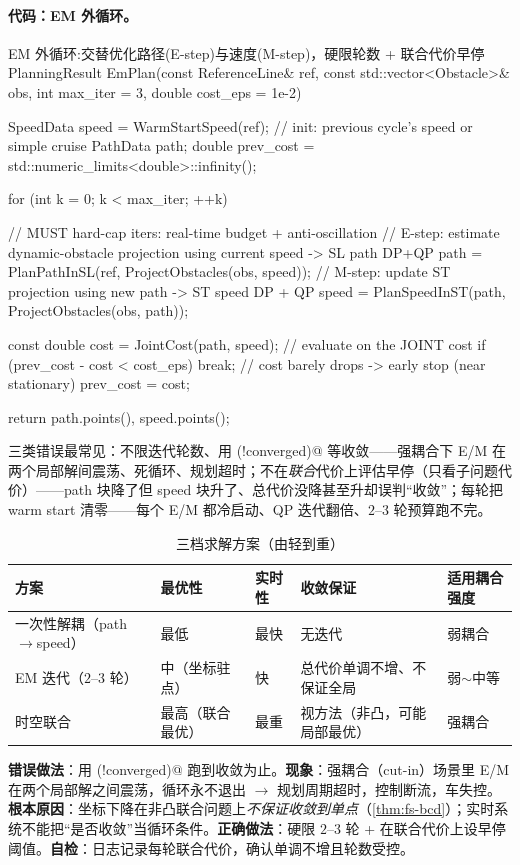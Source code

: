 \paragraph{代码：EM 外循环。}
\begin{codebox}[C++]{EM 外循环:交替优化路径(E-step)与速度(M-step)，硬限轮数 + 联合代价早停}
PlanningResult EmPlan(const ReferenceLine& ref, const std::vector<Obstacle>& obs,
                      int max_iter = 3, double cost_eps = 1e-2) {
  SpeedData speed = WarmStartSpeed(ref);   // init: previous cycle's speed or simple cruise
  PathData  path;
  double prev_cost = std::numeric_limits<double>::infinity();

  for (int k = 0; k < max_iter; ++k) {     // MUST hard-cap iters: real-time budget + anti-oscillation
    // E-step: estimate dynamic-obstacle projection using current speed -> SL path DP+QP
    path  = PlanPathInSL(ref, ProjectObstacles(obs, speed));
    // M-step: update ST projection using new path -> ST speed DP + QP
    speed = PlanSpeedInST(path, ProjectObstacles(obs, path));

    const double cost = JointCost(path, speed);   // evaluate on the JOINT cost
    if (prev_cost - cost < cost_eps) break;       // cost barely drops -> early stop (near stationary)
    prev_cost = cost;
  }
  return {path.points(), speed.points()};
}
\end{codebox}
三类错误最常见：不限迭代轮数、用 \verb@while (!converged)@ 等收敛——强耦合下 E/M 在两个局部解间震荡、死循环、规划超时；不在\emph{联合}代价上评估早停（只看子问题代价）——path 块降了但 speed 块升了、总代价没降甚至升却误判“收敛”；每轮把 warm start 清零——每个 E/M 都冷启动、QP 迭代翻倍、$2$--$3$ 轮预算跑不完。

\begin{table}[H]\centering\small
\caption{三档求解方案（由轻到重）}
\label{tab:fs-three-tier}
\begin{tabular}{lllll}
\toprule
方案 & 最优性 & 实时性 & 收敛保证 & 适用耦合强度 \\
\midrule
一次性解耦（path$\to$speed） & 最低 & 最快 & 无迭代 & 弱耦合 \\
EM 迭代（$2$--$3$ 轮） & 中（坐标驻点） & 快 & 总代价单调不增、不保证全局 & 弱$\sim$中等 \\
时空联合 & 最高（联合最优） & 最重 & 视方法（非凸，可能局部最优） & 强耦合 \\
\bottomrule
\end{tabular}
\end{table}

\begin{pitfall}
\textbf{错误做法}：用 \verb@while (!converged)@ 跑到收敛为止。\textbf{现象}：强耦合（cut-in）场景里 E/M 在两个局部解之间震荡，循环永不退出 $\to$ 规划周期超时，控制断流，车失控。\textbf{根本原因}：坐标下降在非凸联合问题上\emph{不保证收敛到单点}（\cref{thm:fs-bcd}）；实时系统不能把“是否收敛”当循环条件。\textbf{正确做法}：硬限 $2$--$3$ 轮 + 在联合代价上设早停阈值。\textbf{自检}：日志记录每轮联合代价，确认单调不增且轮数受控。
\end{pitfall}

